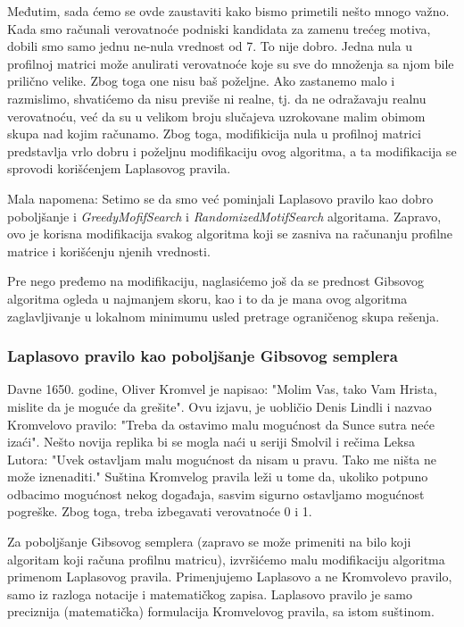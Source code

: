 Međutim, sada ćemo se ovde zaustaviti kako bismo primetili nešto mnogo važno. Kada smo računali verovatnoće podniski kandidata za zamenu trećeg motiva, dobili smo samo jednu ne-nula vrednost od 7. To nije dobro. Jedna nula u profilnoj matrici može anulirati verovatnoće koje su sve do množenja sa njom bile prilično velike. Zbog toga one nisu baš poželjne. Ako zastanemo malo i razmislimo, shvatićemo da nisu previše ni realne, tj. da ne odražavaju realnu verovatnoću, već da su u velikom broju slučajeva uzrokovane malim obimom skupa nad kojim računamo. Zbog toga, modifikicija nula u profilnoj matrici predstavlja vrlo dobru i poželjnu modifikaciju ovog algoritma, a ta modifikacija se sprovodi korišćenjem Laplasovog pravila.

Mala napomena: Setimo se da smo već pominjali Laplasovo pravilo kao dobro poboljšanje i \textit{GreedyMofifSearch} i \textit{RandomizedMotifSearch} algoritama. Zapravo, ovo je korisna modifikacija svakog algoritma koji se zasniva na računanju profilne matrice i korišćenju njenih vrednosti.

Pre nego pređemo na modifikaciju, naglasićemo još da se prednost Gibsovog algoritma ogleda u najmanjem skoru, kao i to da je mana ovog algoritma zaglavljivanje u lokalnom minimumu usled pretrage ograničenog skupa rešenja. 

\subsubsection{Laplasovo pravilo kao poboljšanje Gibsovog semplera}

Davne 1650. godine, Oliver Kromvel je napisao:
"Molim Vas, tako Vam Hrista, mislite da je moguće da grešite". 
Ovu izjavu, je uobličio Denis Lindli i nazvao Kromvelovo pravilo:
"Treba da ostavimo malu mogućnost da Sunce sutra neće izaći".
Nešto novija replika bi se mogla naći u seriji Smolvil i rečima Leksa Lutora: "Uvek ostavljam malu mogućnost da nisam u pravu. Tako me ništa ne može iznenaditi."
Suština Kromvelog pravila leži u tome da, ukoliko potpuno odbacimo mogućnost nekog događaja, sasvim sigurno ostavljamo mogućnost pogreške. Zbog toga, treba izbegavati verovatnoće 0 i 1.

Za poboljšanje Gibsovog semplera (zapravo se može primeniti na bilo koji algoritam koji računa profilnu matricu), izvršićemo malu modifikaciju algoritma primenom Laplasovog pravila. Primenjujemo Laplasovo a ne Kromvolevo pravilo, samo iz razloga notacije i matematičkog zapisa. Laplasovo pravilo je samo preciznija (matematička) formulacija Kromvelovog pravila, sa istom suštinom. 


